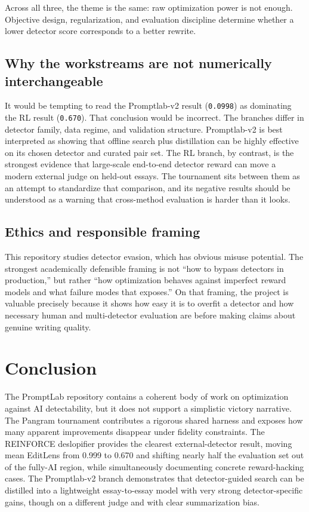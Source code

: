 \documentclass[11pt]{article}
\begin{document}
Across all three, the theme is the same: raw optimization power is not enough. Objective design, regularization, and evaluation discipline determine whether a lower detector score corresponds to a better rewrite.

\subsection{Why the workstreams are not numerically interchangeable}

It would be tempting to read the Promptlab-v2 result (\texttt{0.0998}) as dominating the RL result (\texttt{0.670}). That conclusion would be incorrect. The branches differ in detector family, data regime, and validation structure. Promptlab-v2 is best interpreted as showing that offline search plus distillation can be highly effective on its chosen detector and curated pair set. The RL branch, by contrast, is the strongest evidence that large-scale end-to-end detector reward can move a modern external judge on held-out essays. The tournament sits between them as an attempt to standardize that comparison, and its negative results should be understood as a warning that cross-method evaluation is harder than it looks.

\subsection{Ethics and responsible framing}

This repository studies detector evasion, which has obvious misuse potential. The strongest academically defensible framing is not ``how to bypass detectors in production,'' but rather ``how optimization behaves against imperfect reward models and what failure modes that exposes.'' On that framing, the project is valuable precisely because it shows how easy it is to overfit a detector and how necessary human and multi-detector evaluation are before making claims about genuine writing quality.

\section{Conclusion}

The PromptLab repository contains a coherent body of work on optimization against AI detectability, but it does not support a simplistic victory narrative. The Pangram tournament contributes a rigorous shared harness and exposes how many apparent improvements disappear under fidelity constraints. The REINFORCE deslopifier provides the clearest external-detector result, moving mean EditLens from 0.999 to 0.670 and shifting nearly half the evaluation set out of the fully-AI region, while simultaneously documenting concrete reward-hacking cases. The Promptlab-v2 branch demonstrates that detector-guided search can be distilled into a lightweight essay-to-essay model with very strong detector-specific gains, though on a different judge and with clear summarization bias.
\end{document}
